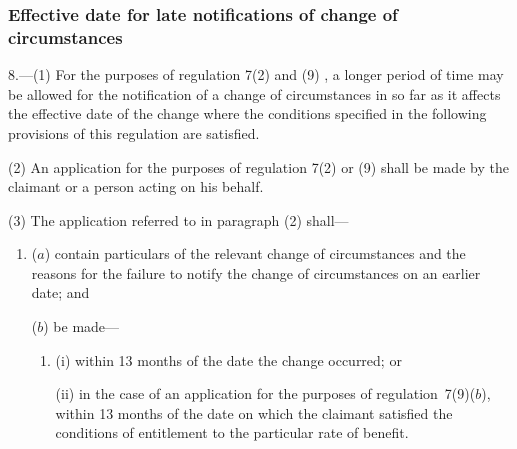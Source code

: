 \documentclass[12pt,a4paper]{article}
\begin{document}

\subsubsection[8. Effective date for late notifications of change of circumstances]{Effective date for late notifications of change of circumstances}

8.—(1) For the purposes of regulation 7(2)
and (9)%
, a longer period of time may be allowed for the notification of a change of circumstances in so far as it affects the effective date of the change where the conditions specified in the following provisions of this regulation are satisfied.

(2) An application for the purposes of regulation 7(2) 
or (9)  %
shall be made by the claimant or a person acting on his behalf.

(3) The application referred to in paragraph (2) shall—
\begin{enumerate}\item[]
($a$) contain particulars of the relevant change of circumstances and the reasons for the failure to notify the change of circumstances on an earlier date; and


($b$) be made—
\begin{enumerate}\item[]
(i) within 13 months of the date the change occurred; or

\begin{sloppypar}
(ii) in the case of an application for the purposes of regulation~7(9)($b$), within 13 months of the date on which the claimant satisfied the conditions of entitlement to the particular rate of benefit.
\end{sloppypar}
\end{enumerate}
\end{enumerate}
\end{document}
